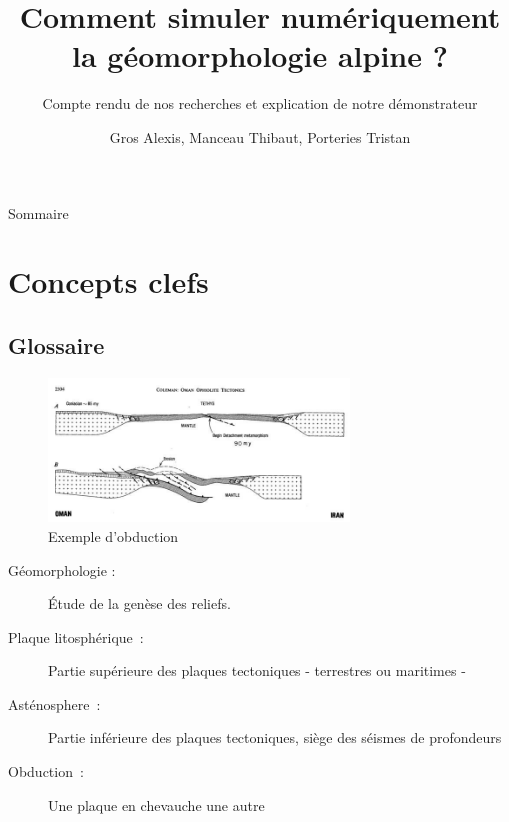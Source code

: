 \documentclass{beamer}
\title{Comment simuler numériquement la géomorphologie alpine ?}
\subtitle{Compte rendu de nos recherches et explication de notre démonstrateur}
\author{Gros Alexis, Manceau Thibaut, Porteries Tristan}
\begin{document}
\frame{\titlepage}
\begin{frame}{Sommaire}
  \begin{multicols}{2}
    \normalsize
    \setcounter{tocdepth}{1}
    \tableofcontents
  \end{multicols}
\end{frame}

\section{Concepts clefs}

\subsection{Glossaire}
\begin{frame}
 \begin{center}
	\begin{figure}
	 \includegraphics[width=8cm]{Images/Images_Alexis/image007.jpg}
	 \caption{Exemple d'obduction}
	\end{figure}
		\begin{description}
		 \item[Géomorphologie :] Étude de la genèse des reliefs.
		 \item[Plaque litosphérique :] Partie supérieure des plaques tectoniques - terrestres ou maritimes -
		 \item[Asténosphere :] Partie inférieure des plaques tectoniques, siège des séismes de profondeurs
		 \item[Obduction :] Une plaque en chevauche une autre
		\end{description}
 \end{center}
\end{frame}
\end{document}

